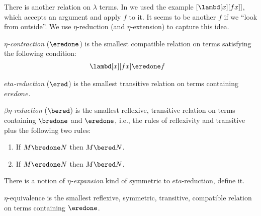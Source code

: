 \documentclass[../../../include/open-logic-section]{subfiles}
\begin{document}

There is another relation on $\lambda$ terms. In
 we used the example $[\lambd[x][fx]]$, which
accepts an argument and apply $f$ to it. 
It seems to be another $f$ if we ``look from outside''.  We use $\eta$-reduction (and $\eta$-extension) to
capture this idea.

\begin{defn}
  \emph{$\eta$-contraction} ($\eredone$) is the smallest compatible relation
  on terms satisfying the following condition:
  \begin{align*}
    &\lambd[x][f x] \eredone f
  \end{align*}
\end{defn}

\begin{defn}
  \emph{$eta$-reduction} ($\ered$) is the smallest transitive relation on terms
  containing $eredone$.
\end{defn}

\begin{defn} 
  \emph{$\beta\eta$-reduction} ($\bered$) is the smallest reflexive,
  transitive relation on terms containing $\bredone$ and $\eredone$,
  i.e., the rules of reflexivity and transitive plus the following two
  rules:
  \begin{enumerate}
  \item If $M \bredone N$ then $M \bered N$. 
  \item If $M \eredone N$ then $M \bered N$. 
  \end{enumerate}
    
\end{defn}

\begin{prob}
  There is a notion of \emph{$\eta$-expansion} kind of symmetric to
  $eta$-reduction, define it.
\end{prob}

\begin{defn}
  $\eta$-equivalence is the smallest reflexive, symmetric, transitive, compatible relation on terms containing $\eredone$.
\end{defn}
\end{document}
